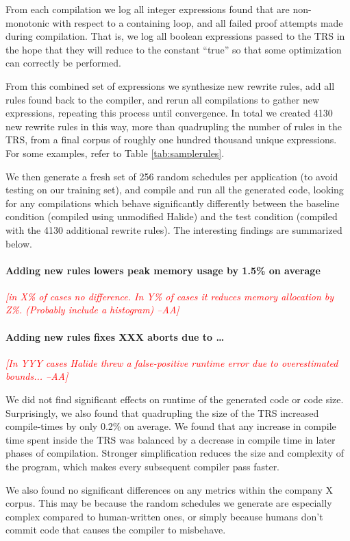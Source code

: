 \documentclass[acmsmall,review,anonymous]{acmart}\settopmatter{printfolios=true,printccs=false,printacmref=false}
\newcommand{\aba}[1]{\textcolor{red}{\textit{[{#1} --AA]}}}
\begin{document}
From each compilation we log all integer expressions found that are non-monotonic with respect to a containing loop, and all failed proof attempts made during compilation. That is, we log all boolean expressions passed to the TRS in the hope that they will reduce to the constant “true” so that some optimization can correctly be performed.

From this combined set of expressions we synthesize new rewrite rules, add all rules found back to the compiler, and rerun all compilations to gather new expressions, repeating this process until convergence. In total we created 4130 new rewrite rules in this way, more than quadrupling the number of rules in the TRS, from a final corpus of roughly one hundred thousand unique expressions. For some examples, refer to Table \ref{tab:samplerules}.

We then generate a fresh set of 256 random schedules per application (to avoid testing on our training set), and compile and run all the generated code, looking for any compilations which behave significantly differently between the baseline condition (compiled using unmodified Halide) and the test condition (compiled with the 4130 additional rewrite rules). The interesting findings are summarized below.

\paragraph{Adding new rules lowers peak memory usage by 1.5\% on average} \aba{in X\% of cases no difference. In Y\% of cases it reduces memory allocation by Z\%. (Probably include a histogram)}

\paragraph{Adding new rules fixes XXX aborts due to …} \aba{In YYY cases Halide threw a false-positive runtime error due to overestimated bounds...}

We did not find significant effects on runtime of the generated code or code size. Surprisingly, we also found that quadrupling the size of the TRS increased compile-times by only 0.2\% on average. We found that any increase in compile time spent inside the TRS was balanced by a decrease in compile time in later phases of compilation. Stronger simplification reduces the size and complexity of the program, which makes every subsequent compiler pass faster.

We also found no significant differences on any metrics within the company X corpus. This may be because the random schedules we generate are especially complex compared to human-written ones, or simply because humans don’t commit code that causes the compiler to misbehave.
\end{document}
